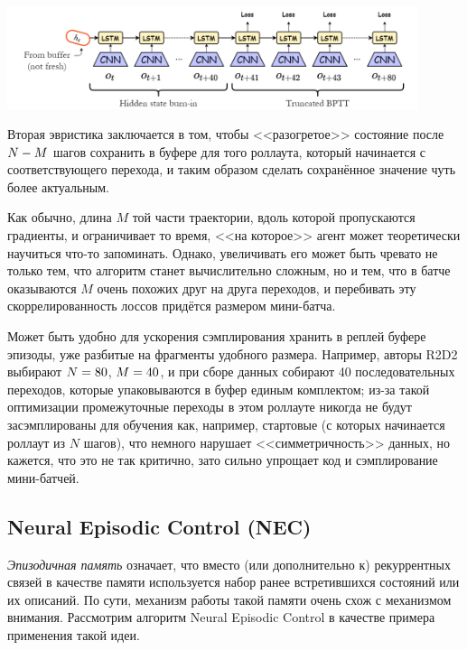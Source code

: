 \begin{center}
    \includegraphics[width=0.9\textwidth]{Images/R2D2.png}
\end{center}

Вторая эвристика заключается в том, чтобы <<разогретое>> состояние после $N \HM- M$ шагов сохранить в буфере для того роллаута, который начинается с соответствующего перехода, и таким образом сделать сохранённое значение чуть более актуальным.

Как обычно, длина $M$ той части траектории, вдоль которой пропускаются градиенты, и ограничивает то время, <<на которое>> агент может теоретически научиться что-то запоминать. Однако, увеличивать его может быть чревато не только тем, что алгоритм станет вычислительно сложным, но и тем, что в батче оказываются $M$ очень похожих друг на друга переходов, и перебивать эту скоррелированность лоссов придётся размером мини-батча.

\begin{remark}
Может быть удобно для ускорения сэмплирования хранить в реплей буфере эпизоды, уже разбитые на фрагменты удобного размера. Например, авторы R2D2 выбирают $N \HM= 80$, $M \HM= 40$, и при сборе данных собирают 40 последовательных переходов, которые упаковываются в буфер единым комплектом; из-за такой оптимизации промежуточные переходы в этом роллауте никогда не будут засэмплированы для обучения как, например, стартовые (с которых начинается роллаут из $N$ шагов), что немного нарушает <<симметричность>> данных, но кажется, что это не так критично, зато сильно упрощает код и сэмплирование мини-батчей.
\end{remark}

\subsection{Neural Episodic Control (NEC)}

\emph{Эпизодичная память} означает, что вместо (или дополнительно к) рекуррентных связей в качестве памяти используется набор ранее встретившихся состояний или их описаний. По сути, механизм работы такой памяти очень схож с механизмом внимания. Рассмотрим алгоритм Neural Episodic Control в качестве примера применения такой идеи.

